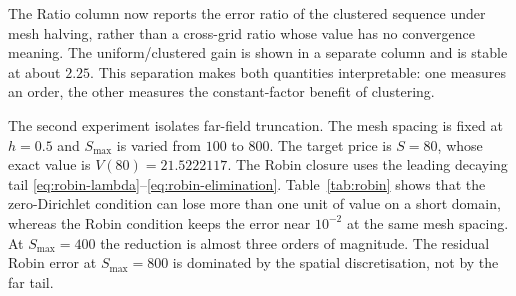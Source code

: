 \documentclass[11pt,a4paper]{article}
\theoremstyle{definition}
\theoremstyle{remark}
\begin{document}
\begin{table}[H]
\centering
{}
\caption{Uniform versus clustered grids at equal $N$ with a node at the
analytic free boundary and the asymptotic Robin closure. The clustered
error ratios are $3.982$, $4.002$, and $3.999$, so the observed order is
two. The clustered boundary error uses the four-point $\sqrt{b_h}$
extrapolation.}
\label{tab:adaptive}
\end{table}

The Ratio column now reports the error ratio of the clustered sequence under
mesh halving, rather than a cross-grid ratio whose value has no convergence
meaning. The uniform/clustered gain is shown in a separate column and is
stable at about $2.25$. This separation makes both quantities interpretable:
one measures an order, the other measures the constant-factor benefit of
clustering.

The second experiment isolates far-field truncation. The mesh spacing is
fixed at $h=0.5$ and $S_{\max}$ is varied from $100$ to $800$. The target
price is $S=80$, whose exact value is $V(80)=21.5222117$. The Robin closure
uses the leading decaying tail \eqref{eq:robin-lambda}--\eqref{eq:robin-elimination}.
Table~\ref{tab:robin} shows that the zero-Dirichlet condition can lose more
than one unit of value on a short domain, whereas the Robin condition keeps
the error near $10^{-2}$ at the same mesh spacing. At $S_{\max}=400$ the
reduction is almost three orders of magnitude. The residual Robin error at
$S_{\max}=800$ is dominated by the spatial discretisation, not by the far
tail.
\end{document}
